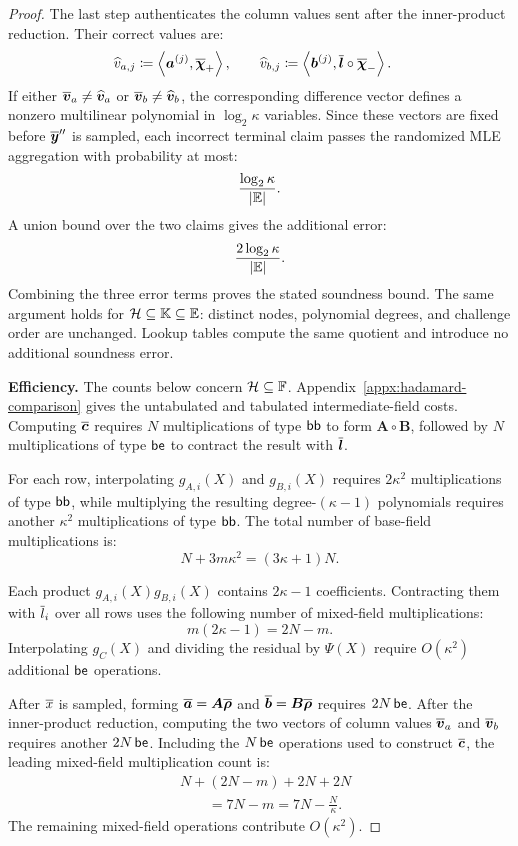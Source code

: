 \begin{proof}
The last step authenticates the column values sent after the
inner-product reduction. Their correct values are:
\[
\begin{aligned}
    \widehat v_{a,j}
    &\coloneqq
    \left\langle
        \bm a^{(j)},\overline{\bm\chi}_+
    \right\rangle,
    \qquad
    \widehat v_{b,j}
    \coloneqq
    \left\langle
        \bm b^{(j)},
        \overline{\bm l}\circ\overline{\bm\chi}_-
    \right\rangle.
\end{aligned}
\]
If either
\(\overline{\bm v}_a\neq\widehat{\bm v}_a\) or
\(\overline{\bm v}_b\neq\widehat{\bm v}_b\), the corresponding
difference vector defines a nonzero multilinear polynomial in
\(\log_2\kappa\) variables. Since these vectors are fixed before
\(\overline{\bm y}''\) is sampled, each incorrect terminal claim
passes the randomized MLE aggregation with probability at most:
\[
    \frac{\log_2\kappa}{|\mathbb{E}|}.
\]
A union bound over the two claims gives the additional error:
\[
    \frac{2\log_2\kappa}{|\mathbb{E}|}.
\]
Combining the three error terms proves the stated soundness bound.
The same argument holds for \(\mathcal H\subseteq\mathbb K
\subseteq\mathbb{E}\): distinct nodes, polynomial degrees,
and challenge order are unchanged. Lookup tables compute the
same quotient and introduce no additional soundness error.

\smallskip\noindent\textbf{Efficiency.}
The counts below concern \(\mathcal H\subseteq{\mathbb{F}}\).
Appendix~\ref{appx:hadamard-comparison} gives the untabulated
and tabulated intermediate-field costs.
Computing
\(\overline{\bm c}\) requires \(N\) multiplications of type \(\mathsf{bb}\)
to form \(\bm A\circ\bm B\), followed by \(N\) multiplications
of type \(\mathsf{be}\) to contract the result with
\(\overline{\bm l}\).

For each row, interpolating
\(g_{A,i}(X)\) and \(g_{B,i}(X)\) requires
\(2\kappa^2\) multiplications of type \(\mathsf{bb}\), while multiplying
the resulting degree-\((\kappa-1)\) polynomials requires another
\(\kappa^2\) multiplications of type \(\mathsf{bb}\). The total number
of base-field multiplications is:
\[
    N+3m\kappa^2
    =
    (3\kappa+1)N.
\]

Each product
\(g_{A,i}(X)g_{B,i}(X)\) contains \(2\kappa-1\)
coefficients. Contracting them with \(\overline{l}_i\) over all rows
uses the following number of mixed-field multiplications:
\[
    m(2\kappa-1)
    =
    2N-m.
\]
Interpolating \(g_C(X)\) and dividing the residual by \(\Psi(X)\)
require
\(O(\kappa^2)\) additional \(\mathsf{be}\) operations.

After \(\overline{x}\) is sampled, forming
\(\overline{\bm a}=\bm A\overline{\bm\rho}\) and
\(\overline{\bm b}=\bm B\overline{\bm\rho}\) requires \(2N\,\mathsf{be}\).
After the inner-product reduction, computing the two vectors of
column values \(\overline{\bm v}_a\) and \(\overline{\bm v}_b\) requires
another \(2N\,\mathsf{be}\). Including the \(N\,\mathsf{be}\) operations used to
construct \(\overline{\bm c}\), the leading mixed-field multiplication
count is:
\[
\begin{aligned}
    &N+(2N-m)+2N+2N\\
    &\qquad=
    7N-m
    =
    7N-\frac{N}{\kappa}.
\end{aligned}
\]
The remaining mixed-field operations contribute \(O(\kappa^2)\).


\end{proof}
